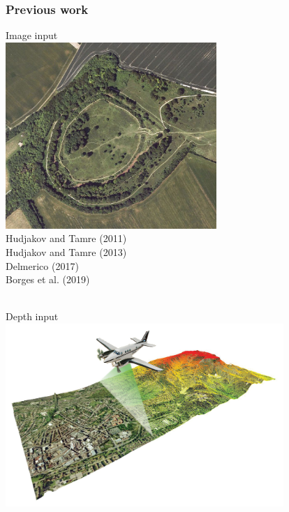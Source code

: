 \documentclass[usenames,dvipsnames,10pt]{beamer}
\begin{document}
\begin{frame}
\begin{center}
\begin{minipage}{0.45\textwidth}
		\centering\tiny{}
	\end{minipage}
\end{center}
\end{frame}

\begin{frame}
\frametitle{Previous work}
\hspace{0.5cm}
\begin{minipage}[]{0.45\textwidth}
	\centering
	Image input \\
	\includegraphics[width=0.6\textwidth]{graphics/aerial_image.jpg} \\
	\centering\tiny{}
	\flushleft
	\scriptsize
	\hspace{0.75cm} Hudjakov and Tamre (2011) \\
	\hspace{0.75cm} Hudjakov and Tamre (2013) \\
	\hspace{0.75cm} Delmerico (2017) \\
	\hspace{0.75cm} Borges et al. (2019) \\
	\hspace{0.75cm} \phantom{Borges et al. (2019)} \\
\end{minipage}%
\begin{minipage}[]{0.45\textwidth}
	\centering
	Depth input \\
	\includegraphics[width=0.79\textwidth]{graphics/lidar_data.jpg} \\

\end{minipage}
\end{frame}
\end{document}
